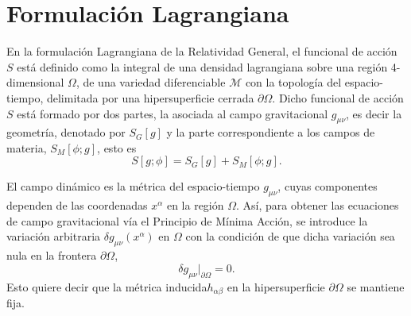 
\section{Formulación Lagrangiana}
\label{sec:FL}

En la formulación Lagrangiana de la Relatividad General, el funcional de acción $S$ está definido como la integral de una densidad lagrangiana sobre una región 4-dimensional $\Omega$, de una variedad diferenciable $\mathcal{M}$ con la topología del espacio-tiempo, delimitada por una hipersuperficie cerrada $\partial \Omega$.  Dicho funcional de acción $S$ está formado por dos partes, la asociada al campo gravitacional $g_{\mu \nu}$, es decir la geometría, denotado por $S_{G}[g]$ y la parte correspondiente a los campos de materia, $S_{M}[\phi; g]$, esto es
%
\begin{equation}
\label{eq:S}
S[g; \phi] = S_{G}[g] + S_{M}[\phi; g].
\end{equation}

El campo dinámico es la métrica del espacio-tiempo $g_{\mu \nu}$, cuyas componentes dependen de las coordenadas $x^{\alpha}$ en la región $\Omega$. Así, para obtener las ecuaciones de campo gravitacional vía el Principio de Mínima Acción, se introduce la variación arbitraria $\delta g_{\mu \nu}(x^{\alpha})$ en $\Omega$ con la condición de que dicha variación sea nula en la frontera $\partial \Omega$,
%
\begin{equation}
\label{eq:boundcond}
\delta g_{\mu \nu} \Big|_{\partial \Omega} = 0.
\end{equation}
Esto quiere decir que la métrica inducida\footnotemark $h_{\alpha \beta}$ en la hipersuperficie $\partial \Omega$ se mantiene fija.

